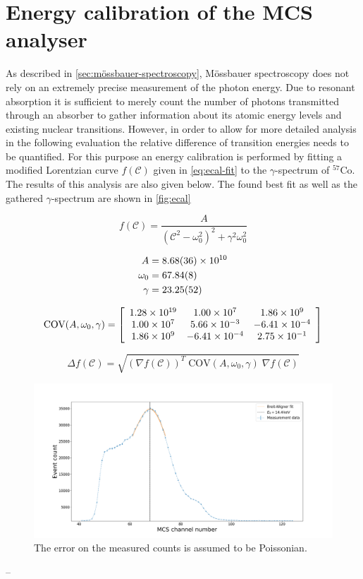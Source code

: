 
\section{Energy calibration of the MCS analyser}
\label{sec:ecal}

As described in \autoref{sec:mössbauer-spectroscopy}, Mössbauer spectroscopy does not
rely on an extremely precise measurement of the photon energy. Due to resonant
absorption it is sufficient to merely count the number of photons transmitted through
an absorber to gather information about its atomic energy levels and existing nuclear
transitions. However, in order to allow for more detailed analysis in the following
evaluation the relative difference of transition energies needs to be quantified.
For this purpose an energy calibration is performed by fitting a modified Lorentzian
curve $f(\mathcal{C})$ given in \autoref{eq:ecal-fit} to the $\gamma$-spectrum of
$^{57}$Co. The results of this analysis are also given below. The found best fit as
well as the gathered $\gamma$-spectrum are shown in \autoref{fig:ecal}

\begin{equation}
\label{eq:ecal-fit}
f(\mathcal{C}) = \frac{A}{(\mathcal{C}^2-\omega_0^2)^2 + \gamma^2\omega_0^2}
\end{equation}

\begin{align*}
	A &= \SI{8.68\pm 0.36e+10}{} \\
	\omega_0 &= \SI{67.84\pm 0.08}{} \\
	\gamma &= \SI{23.25\pm 0.52}{}
\end{align*}

\begin{equation*}
\text{COV}(A,\omega_0,\gamma) =
\left[
\begin{array}{c c c}
	1.28\times10^{19} & 1.00\times10^{7} & 1.86\times10^{9} \\
	1.00\times10^{7} & 5.66\times10^{-3} & -6.41\times10^{-4} \\
	1.86\times10^{9} & -6.41\times10^{-4} & 2.75\times10^{-1}
\end{array}
\right]
\end{equation*}

\begin{equation*}
	\Delta f(\mathcal{C}) = \sqrt{ (\nabla f(\mathcal{C}))^T\;\text{COV}(A,\omega_0,\gamma)\;\nabla f(\mathcal{C})}
\end{equation*}

\begin{figure}
	\centering
	\includegraphics[width=1.0\textwidth]{./fig/calibration.png}
	\caption{The error on the measured counts is assumed to be Poissonian.}
	\label{fig:ecal}
\end{figure}

--
